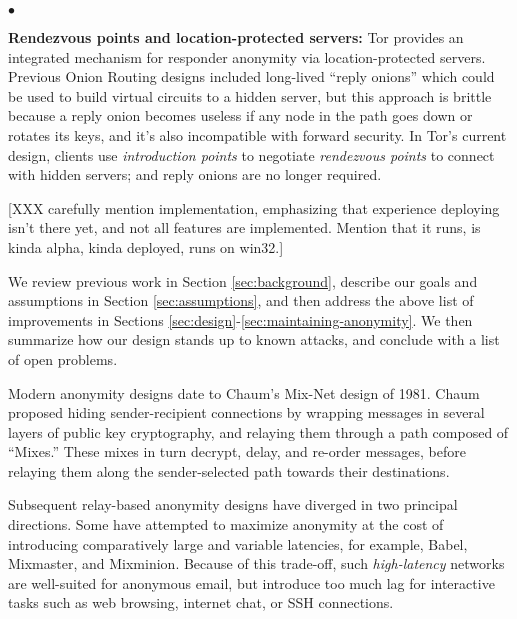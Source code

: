 \documentclass[times,10pt,twocolumn]{article}
\newenvironment{tightlist}{\begin{list}{$\bullet$}{
  \setlength{\itemsep}{0mm}
    \setlength{\parsep}{0mm}
    }}{\end{list}}
\begin{document}
\begin{tightlist}
\item \textbf{Rendezvous points and location-protected servers:} Tor
provides an integrated mechanism for responder anonymity via
location-protected servers.  Previous Onion Routing designs included
long-lived ``reply onions'' which could be used to build virtual
circuits to a hidden server, but this approach is 
brittle because a reply onion becomes useless if any node in the
path goes down or rotates its keys, and it's also
incompatible with forward security.  In Tor's
current design, clients use {\it introduction points} to negotiate {\it
rendezvous points} to connect with hidden servers; and reply onions
are no longer required.
\end{tightlist}

[XXX carefully mention implementation, emphasizing that experience
deploying isn't there yet, and not all features are implemented.
Mention that it runs, is kinda alpha, kinda deployed, runs on win32.]

We review previous work in Section \ref{sec:background}, describe
our goals and assumptions in Section \ref{sec:assumptions},
and then address the above list of improvements in Sections
\ref{sec:design}-\ref{sec:maintaining-anonymity}. We then summarize
how our design stands up to known attacks, and conclude with a list of
open problems.


\label{sec:background}

\label{sec:related-work}
Modern anonymity designs date to Chaum's Mix-Net\cite{chaum-mix} design of
1981.  Chaum proposed hiding sender-recipient connections by wrapping
messages in several layers of public key cryptography, and relaying them
through a path composed of ``Mixes.''  These mixes in turn decrypt, delay,
and re-order messages, before relaying them along the sender-selected
path towards their destinations.

Subsequent relay-based anonymity designs have diverged in two
principal directions.  Some have attempted to maximize anonymity at
the cost of introducing comparatively large and variable latencies,
for example, Babel\cite{babel}, Mixmaster\cite{mixmaster-spec}, and
Mixminion\cite{minion-design}.  Because of this
trade-off, such \emph{high-latency} networks are well-suited for anonymous
email, but introduce too much lag for interactive tasks such as web browsing,
internet chat, or SSH connections.
\end{document}
